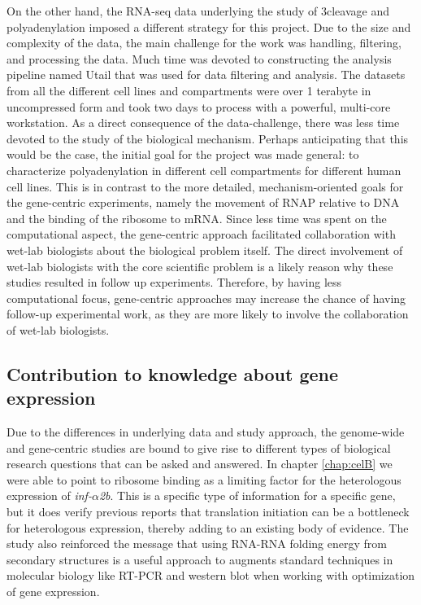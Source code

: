 On the other hand, the RNA-seq data underlying the study of 3\ppp cleavage and
polyadenylation imposed a different strategy for this project. Due to the size
and complexity of the data, the main challenge for the work was handling,
filtering, and processing the data. Much time was devoted to constructing the
analysis pipeline named Utail that was used for data filtering and analysis.
The datasets from all the different cell lines and compartments were over 1
terabyte in uncompressed form and took two days to process with a powerful,
multi-core workstation. As a direct consequence of the data-challenge, there
was less time devoted to the study of the biological mechanism. Perhaps
anticipating that this would be the case, the initial goal for the project was
made general: to characterize polyadenylation in different cell compartments
for different human cell lines. This is in contrast to the more detailed,
mechanism-oriented goals for the gene-centric experiments, namely the movement
of RNAP relative to DNA and the binding of the ribosome to mRNA.  Since less
time was spent on the computational aspect, the gene-centric approach
facilitated collaboration with wet-lab biologists about the biological problem
itself. The direct involvement of wet-lab biologists with the core scientific
problem is a likely reason why these studies resulted in follow up experiments.
Therefore, by having less computational focus, gene-centric approaches may
increase the chance of having follow-up experimental work, as they are more
likely to involve the collaboration of wet-lab biologists.

\subsection{Contribution to knowledge about gene expression}
Due to the differences in underlying data and study approach, the genome-wide
and gene-centric studies are bound to give rise to different types of
biological research questions that can be asked and answered. In chapter
\ref{chap:celB} we were able to point to ribosome binding as a limiting factor
for the heterologous expression of \textit{inf-$\alpha$2b}. This is a specific
type of information for a specific gene, but it does verify previous reports
that translation initiation can be a bottleneck for heterologous expression,
thereby adding to an existing body of evidence. The study also reinforced the
message that using RNA-RNA folding energy from secondary structures is a useful
approach to augments standard techniques in molecular biology like RT-PCR and
western blot when working with optimization of gene expression.

